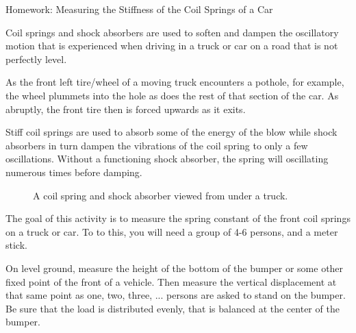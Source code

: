 \documentclass[14pt]{article}
\newcommand{\subheading}[1]{{\boldtenrm #1}}
\begin{document}
\subheading{Homework: Measuring the Stiffness of the Coil Springs of a Car}

Coil springs and shock absorbers are used to soften and dampen the oscillatory motion that is experienced when driving in a truck or car on a road that is not perfectly level. 

As the front left tire/wheel of a moving truck encounters a pothole, for example, the wheel plummets into the hole as does the rest of that section of the car. As abruptly, the front tire then is forced upwards as it exits. 

Stiff coil springs are used to absorb some of the energy of the blow while shock absorbers in turn dampen the vibrations of the coil spring to only a few oscillations.  Without a functioning shock absorber, the spring will oscillating numerous times before damping.

\begin{figure}
    \centering
    \caption{A coil spring and shock absorber viewed from under a truck.}
   \label{fig:truck-coil-and-shock}
\end{figure}

The goal of this activity is to measure the spring constant of the front coil springs on a truck or car. To to this,
you will need a group of 4-6 persons, and a meter stick. 

On level ground, measure the height of the bottom of the bumper or some other fixed point of the front of a vehicle. Then measure the vertical displacement at that same point as one, two, three, ... persons are asked to stand on the bumper. Be sure that the load is distributed evenly, that is balanced at the center of the bumper. 
\end{document}
